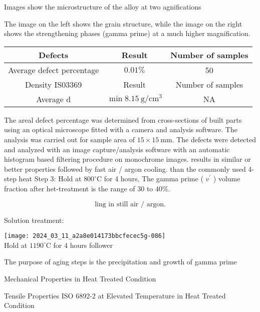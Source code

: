 \documentclass[10pt]{article}
\begin{document}
Images show the microstructure of the alloy at two agnifications

The image on the left shows the grain structure, while the image on the right shows the strengthening phases (gamma prime) at a much higher magnification.

\begin{center}
\begin{tabular}{|c|c|c|}
\hline
Defects & Result & Number of samples \\
\hline
Average defect percentage & $0.01 \%$ & 50 \\
\hline
Density IS03369 & Result & Number of samples \\
\hline
Average d & $\min 8.15 \mathrm{~g} / \mathrm{cm}^{3}$ & NA \\
\hline
\end{tabular}
\end{center}

The areal defect percentage was determined from cross-sections of built parts using an optical microscope fitted with a camera and analysis software. The analysis was carried out for sample area of $15 \times 15 \mathrm{~mm}$. The defects were detected and analyzed with an image capture/analysis software with an automatic histogram based filtering procedure on monochrome images. results in similar or better properties followed by fast air / argon cooling. than the commonly used 4-step heat Step 3: Hold at $800^{\circ} \mathrm{C}$ for 4 hours, The gamma prime ( $v^{\prime}$ ) volume fraction after het-treatment is the range of 30 to $40 \%$.

$$
\text { ling in still air / argon. }
$$

Solution treatment:

\texttt{[image: 2024\_03\_11\_a2a8e014173bbcfecec5g-086]}\\
Hold at $1190^{\circ} \mathrm{C}$ for 4 hours follower

The purpose of aging steps is the precipitation and growth of gamma prime

Mechanical Properties in Heat Treated Condition

Tensile Properties ISO 6892-2 at Elevated Temperature in Heat Treated Condition
\end{document}
